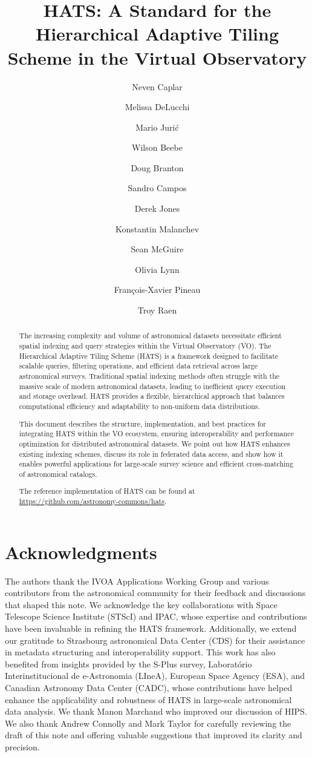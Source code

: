 \documentclass[11pt,a4paper]{ivoa}
\title{HATS: A Standard for the Hierarchical Adaptive Tiling Scheme in the Virtual Observatory}
\author[https://www.ivoa.net/authors/caplar]{Neven Caplar}
\author[https://www.ivoa.net/authors/delucchi]{Melissa DeLucchi}
\author[https://www.ivoa.net/authors/juric]{Mario Juri\'{c}}
\author[https://www.ivoa.net/authors/beebe]{Wilson Beebe}
\author[https://www.ivoa.net/authors/branton]{Doug Branton}
\author[https://www.ivoa.net/authors/campos]{Sandro Campos}
\author[https://www.ivoa.net/authors/jones]{Derek Jones}
\author[https://www.ivoa.net/authors/malanchev]{Konstantin Malanchev}
\author[https://www.ivoa.net/authors/mcguire]{Sean McGuire}
\author[https://www.ivoa.net/authors/lynn]{Olivia Lynn}
\author[https://www.ivoa.net/authors/pineau]{François-Xavier Pineau}
\author[https://www.ivoa.net/authors/raen]{Troy Raen}
\begin{document}
\begin{abstract}
The increasing complexity and volume of astronomical datasets necessitate efficient spatial indexing and query strategies within the Virtual Observatory (VO). 
The Hierarchical Adaptive Tiling Scheme (HATS) is a framework designed to facilitate scalable queries, filtering operations, and efficient data retrieval across large astronomical surveys. 
Traditional spatial indexing methods often struggle with the massive scale of modern astronomical datasets, leading to inefficient query execution and storage overhead. 
HATS provides a flexible, hierarchical approach that balances computational efficiency and adaptability to non-uniform data distributions.\par

This document describes the structure, implementation, and best practices for integrating HATS within the VO ecosystem, ensuring interoperability and performance optimization for distributed astronomical datasets. We point out how HATS enhances existing indexing schemes, discuss its role in federated data access, and show how it enables powerful applications for large-scale survey science and efficient cross-matching of astronomical catalogs. \par 
The reference implementation of HATS can be found at \url{https://github.com/astronomy-commons/hats}. 

\end{abstract}

\section*{Acknowledgments}
The authors thank the IVOA Applications Working Group and various contributors from the astronomical community for their feedback and discussions that shaped this note. 
We acknowledge the key collaborations with Space Telescope Science Institute (STScI) and IPAC, whose expertise and contributions have been invaluable in refining the HATS framework. 
Additionally, we extend our gratitude to  Strasbourg astronomical Data Center (CDS) for their assistance in metadata structuring and interoperability support. 
This work has also benefited from insights provided by the S-Plus survey, Laboratório Interinstitucional de e-Astronomia (LIneA), European Space Agency (ESA), and Canadian Astronomy Data Center (CADC), whose contributions have helped enhance the applicability and robustness of HATS in large-scale astronomical data analysis. 
We thank Manon Marchand who improved our discussion of HIPS. We also thank Andrew Connolly and Mark Taylor for carefully reviewing the draft of this note and offering valuable suggestions that improved its clarity and precision.  \par
\end{document}
